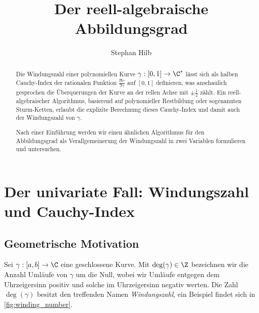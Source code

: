 \documentclass{mythesis}
\title{Der reell-algebraische Abbildungsgrad}
\author{Stephan Hilb}
\begin{document}
\maketitle

\begin{abstract}
    Die Windungszahl einer polynomiellen Kurve $\gamma: [0, 1] \to \C^*$ lässt sich als halben Cauchy-Index der rationalen Funktion $\frac{\Re \gamma}{\Im \gamma}$ auf $[0,1]$ definieren, was anschaulich gesprochen die Überquerungen der Kurve an der rellen Achse mit $\pm \frac{1}{2}$ zählt.
    Ein reell-algebraischer Algorithmus, basierend auf polynomieller Restbildung oder sogenannten Sturm-Ketten, erlaubt die explizite Berechnung dieses Cauchy-Index und damit auch der Windungszahl von $\gamma$.

    Nach einer Einführung werden wir einen ähnlichen Algorithmus für den Abbildungsgrad als Verallgemeinerung der Windungszahl in zwei Variablen formulieren und untersuchen.
\end{abstract}


{\let\clearpage\relax\tableofcontents}


\section{Der univariate Fall: Windungszahl und Cauchy-Index} \label{sec:1}

\subsection{Geometrische Motivation}

Sei $\gamma: [a,b] \to \C$ eine geschlossene Kurve.
Mit $\deg(\gamma) \in \Z$ bezeichnen wir die Anzahl Umläufe von $\gamma$ um die Null, wobei wir Umläufe entgegen dem Uhrzeigersinn positiv und solche im Uhrzeigersinn negativ werten.
Die Zahl $\deg(\gamma)$ besitzt den treffenden Namen \emph{Windungszahl}, ein Beispiel findet sich in \ref{fig:winding_number}.
\end{document}
